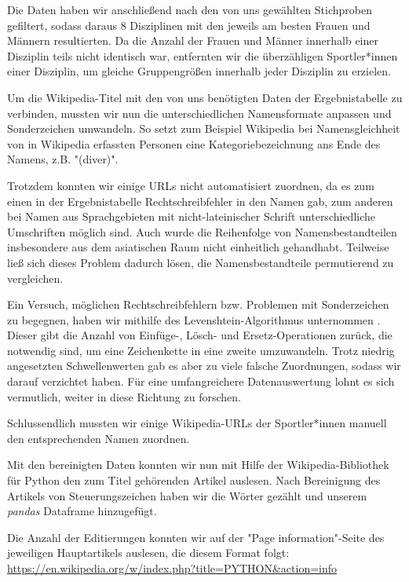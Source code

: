 \documentclass[11pt]{article}
\begin{document}
Die Daten haben wir anschließend nach den von uns gewählten Stichproben gefiltert, sodass daraus 8 Disziplinen mit den jeweils am besten Frauen und Männern resultierten. Da die Anzahl der Frauen und Männer innerhalb einer Disziplin teils nicht identisch war, entfernten wir die überzähligen Sportler*innen einer Disziplin, um gleiche Gruppengrößen innerhalb jeder Disziplin zu erzielen.

Um die Wikipedia-Titel mit den von uns benötigten Daten der Ergebnistabelle zu verbinden, mussten wir nun die unterschiedlichen Namensformate anpassen und Sonderzeichen umwandeln. So setzt zum Beispiel Wikipedia bei Namensgleichheit von in Wikipedia erfassten Personen eine Kategoriebezeichnung ans Ende des Namens, z.B. "(diver)".

Trotzdem konnten wir einige URLs nicht automatisiert zuordnen, da es zum einen in der Ergebnistabelle Rechtschreibfehler in den Namen gab, zum anderen bei Namen aus Sprachgebieten mit nicht-lateinischer Schrift unterschiedliche Umschriften möglich sind. Auch wurde die Reihenfolge von Namensbestandteilen insbesondere aus dem asiatischen Raum nicht einheitlich gehandhabt. Teilweise ließ sich dieses Problem dadurch lösen, die Namensbestandteile permutierend zu vergleichen. 

Ein Versuch, möglichen Rechtschreibfehlern bzw. Problemen mit Sonderzeichen zu begegnen, haben wir mithilfe des Levenshtein-Algorithmus unternommen \parencite{Sulzberger2019}. Dieser gibt die Anzahl von Einfüge-, Lösch- und Ersetz-Operationen zurück, die notwendig sind, um eine Zeichenkette in eine zweite umzuwandeln. Trotz niedrig angesetzten Schwellenwerten gab es aber zu viele falsche Zuordnungen, sodass wir darauf verzichtet haben. Für eine umfangreichere Datenauswertung lohnt es sich vermutlich, weiter in diese Richtung zu forschen. 

Schlussendlich mussten wir einige Wikipedia-URLs der Sportler*innen manuell den entsprechenden Namen zuordnen. 

Mit den bereinigten Daten konnten wir nun mit Hilfe der Wikipedia-Bibliothek für Python \cite{goldsmith} den zum Titel gehörenden Artikel auslesen. Nach Bereinigung des Artikels von Steuerungszeichen haben wir die Wörter gezählt und unserem \textit{pandas} Dataframe hinzugefügt. 

Die Anzahl der Editierungen konnten wir auf der "Page information"-Seite des jeweiligen Hauptartikels auslesen, die diesem Format folgt:
\url{https://en.wikipedia.org/w/index.php?title=PYTHON&action=info}
\end{document}
